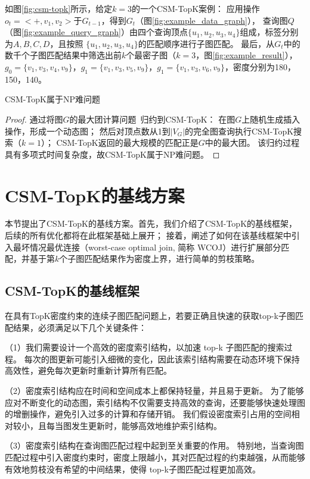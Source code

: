     如图\ref{fig:csm-topk}所示，给定$k=3$的一个CSM-TopK案例：
    应用操作$o_t=<+,v_1, v_2>$于$G_{t-1}$，得到$G_t$（图\ref{fig:example_data_graph}），
    查询图$Q$（图\ref{fig:example_query_graph}）由四个查询顶点$\{u_1, u_2, u_3, u_4\}$组成，标签分别为$A,B,C,D$，且按照
    $\{u_1, u_2, u_3, u_4\}$的匹配顺序进行子图匹配。
    最后，从$G_t$中的数千个子图匹配结果中筛选出前$k$个最密子图（$k=3$，图\ref{fig:example_result}），
    $g_0=\{v_1, v_3, v_4, v_9\}$，$g_1=\{v_1, v_3, v_5, v_9\}$，$g_1=\{v_1, v_3, v_6, v_9\}$，密度分别为180，150，140。
    \begin{theorem} \label{theorem:np-hard}
    CSM-TopK属于NP难问题
    \end{theorem}
    \begin{proof}
    通过将图$G$的最大团计算问题~\cite{clique-DBLP:journals/eor/WuH15}归约到CSM-TopK：
    在图$G$上随机生成插入操作，形成一个动态图；
    然后对顶点数从1到$|V_G|$的完全图查询执行CSM-TopK搜索（$k=1$）；
    CSM-TopK返回的最大规模的匹配正是$G$中的最大团。
    该归约过程具有多项式时间复杂度，故CSM-TopK属于NP难问题。
    \end{proof}
\section{CSM-TopK的基线方案}
本节提出了CSM-TopK的基线方案。首先，我们介绍了CSM-TopK的基线框架，后续的所有优化都将在此框架基础上展开；
接着，阐述了如何在该基线框架中引入最坏情况最优连接（worst-case optimal join, 简称 WCOJ）进行扩展部分匹配，并基于第$k$个子图匹配结果作为密度上界，进行简单的剪枝策略。
\subsection{CSM-TopK的基线框架}
\label{ch3:base-framework}
在具有TopK密度约束的连续子图匹配问题上，若要正确且快速的获取top-k子图匹配结果，必须满足以下几个关键条件：

（1）我们需要设计一个高效的密度索引结构，以加速 top-k 子图匹配的搜索过程。
每次的图更新可能引入细微的变化，因此该索引结构需要在动态环境下保持高效性，避免每次更新时重新计算所有匹配。

（2）密度索引结构应在时间和空间成本上都保持轻量，并且易于更新。
为了能够应对不断变化的动态图，索引结构不仅需要支持高效的查询，还要能够快速处理图的增删操作，避免引入过多的计算和存储开销。
我们假设密度索引占用的空间相对较小，且每当图发生更新时，能够高效地维护索引结构。

（3）密度索引结构在查询图匹配过程中起到至关重要的作用。
特别地，当查询图匹配过程中引入密度约束时，密度上限越小，其对匹配过程的约束越强，从而能够有效地剪枝没有希望的中间结果，使得 top-k子图匹配过程更加高效。

